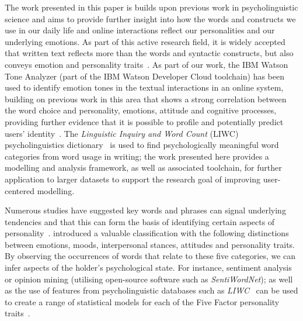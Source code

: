 \documentclass[graybox]{svmult}
\begin{document}
The work presented in this paper is builds upon previous work in
psycholinguistic science and aims to provide further insight into how
the words and constructs we use in our daily life and online
interactions reflect our personalities and our underlying emotions. As
part of this active research field, it is widely accepted that written
text reflects more than the words and syntactic constructs, but also
conveys emotion and personality
traits~\citep{pennebaker+king:1999}. As part of our work, the IBM
Watson Tone Analyzer (part of the IBM Watson Developer Cloud
toolchain) has been used to identify emotion tones in the textual
interactions in an online system, building on previous work in this
area that shows a strong correlation between the word choice and
personality, emotions, attitude and cognitive processes, providing
further evidence that it is possible to profile and potentially
predict users’ identity~\citep{fast+funder:2008}. The
{\emph{Linguistic Inquiry and Word Count}} (LIWC) psycholinguistics
dictionary~\citep{pennebaker-et-al:2001,tausczik+pennebaker:2010} is
used to find psychologically meaningful word categories from word
usage in writing; the work presented here provides a modelling and
analysis framework, as well as associated toolchain, for further
application to larger datasets to support the research goal of
improving user-centered modelling.




Numerous studies have suggested key words and phrases can signal
underlying tendencies and that this can form the basis of identifying
certain aspects of
personality~\citep{iacobelli-et-al:2011,pennebaker+king:1999,oberlander+gill:2004,oberlander+gill:2006}.
\citet{scherer:1984} introduced a valuable classification with the
following distinctions between emotions, moods, interpersonal stances,
attitudes and personality traits. By observing the occurrences of words that relate to these five categories, we can infer aspects of the holder's psychological state. For instance, sentiment analysis or
opinion mining (utilising open-source software such as
{\emph{SentiWordNet}}); as well as the use of features from
psycholinguistic databases such as
{\emph{LIWC}}~\citep{pennebaker-et-al:2001} can be used to create a range of
statistical models for each of the Five Factor personality
traits~\citep{mairesse-et-al:2007}. 
\end{document}
